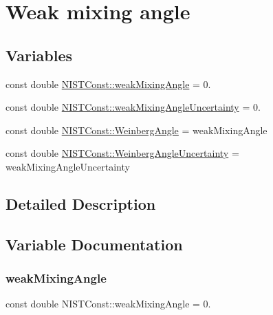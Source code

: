 \hypertarget{group___n_i_s_t_const-_weak_mixing_angle}{}\section{Weak mixing angle}
\label{group___n_i_s_t_const-_weak_mixing_angle}
\subsection*{Variables}
\begin{DoxyCompactItemize}
\item 
const double \hyperlink{group___n_i_s_t_const-_weak_mixing_angle_gaf4037fe32df08c9c7eccd8487b5eab34}{N\+I\+S\+T\+Const\+::weak\+Mixing\+Angle} = 0.
\item 
const double \hyperlink{group___n_i_s_t_const-_weak_mixing_angle_ga6b461a8ed9af6322050586b5919cda98}{N\+I\+S\+T\+Const\+::weak\+Mixing\+Angle\+Uncertainty} = 0.
\item 
const double \hyperlink{group___n_i_s_t_const-_weak_mixing_angle_gaa27d3628b9e064d9d8d998be81b6adf0}{N\+I\+S\+T\+Const\+::\+Weinberg\+Angle} = weak\+Mixing\+Angle
\item 
const double \hyperlink{group___n_i_s_t_const-_weak_mixing_angle_ga923e5bc037fee920767800b7cc9ad724}{N\+I\+S\+T\+Const\+::\+Weinberg\+Angle\+Uncertainty} = weak\+Mixing\+Angle\+Uncertainty
\end{DoxyCompactItemize}


\subsection{Detailed Description}


\subsection{Variable Documentation}
\mbox{\label{group___n_i_s_t_const-_weak_mixing_angle_gaf4037fe32df08c9c7eccd8487b5eab34}} 
\subsubsection{\texorpdfstring{weak\+Mixing\+Angle}{weakMixingAngle}}
{\footnotesize\ttfamily const double N\+I\+S\+T\+Const\+::weak\+Mixing\+Angle = 0.}


